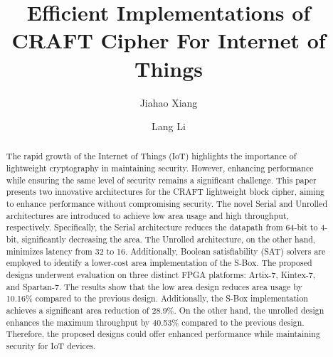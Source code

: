 \documentclass[final,5p,times,twocolumn]{elsarticle}
\begin{document}
\begin{frontmatter}

    \title{Efficient Implementations of CRAFT Cipher For Internet of Things }

    \author[a,b]{Jiahao Xiang}

    \author[a,b]{Lang Li}







    \begin{abstract}
        The rapid growth of the Internet of Things (IoT) highlights the importance of lightweight cryptography in maintaining security.
        However, enhancing performance while ensuring the same level of security remains a significant challenge.
        This paper presents two innovative architectures for the CRAFT lightweight block cipher, aiming to enhance performance without compromising security.
        The novel Serial and Unrolled architectures are introduced to achieve low area usage and high throughput, respectively.
        Specifically, the Serial architecture reduces the datapath from 64-bit to 4-bit, significantly decreasing the area.
        The Unrolled architecture, on the other hand, minimizes latency from 32 to 16.
        Additionally, Boolean satisfiability (SAT) solvers are employed to identify a lower-cost area implementation of the S-Box.
        The proposed designs underwent evaluation on three distinct FPGA platforms: Artix-7, Kintex-7, and Spartan-7.
        The results show that the low area design reduces area usage by 10.16\% compared to the previous design. Additionally, the S-Box implementation achieves a significant area reduction of 28.9\%. On the other hand, the unrolled design enhances the maximum throughput by 40.53\% compared to the previous design. Therefore, the proposed designs could offer enhanced performance while maintaining security for IoT devices.
    \end{abstract}



\end{frontmatter}
\end{document}
